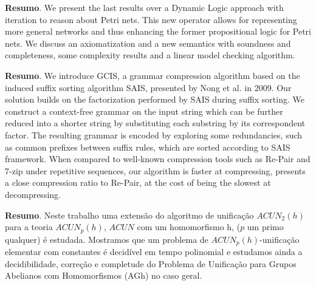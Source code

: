	\vspace{24pt}


	\noindent\textbf{Resumo}.\label{blv} 
	We present the last results over a Dynamic Logic approach with iteration to reason about Petri nets. This new operator allows for representing more general networks and thus enhancing the former propositional logic for Petri nets. We discuss an axiomatization and a new semantics with soundness and completeness, some complexity results and a linear model checking algorithm.

\vspace{24pt}
	
	
	\noindent\textbf{Resumo}.\label{ds} 
	We introduce GCIS, a grammar compression algorithm based on the induced suffix sorting algorithm SAIS, presented by Nong et al. in 2009. Our solution builds on the factorization performed by SAIS during suffix sorting. We construct a context-free grammar on the input string which can be further reduced into a shorter string by substituting each substring by its correspondent factor. The resulting grammar is encoded by exploring some redundancies, such as common prefixes between suffix rules, which are sorted according to SAIS framework. When compared to well-known compression tools such as Re-Pair and 7-zip under repetitive sequences, our algorithm is faster at compressing, presents a close compression ratio to Re-Pair, at the cost of being the slowest at decompressing.
	
	\vspace{24pt}
	
	
	\noindent\textbf{Resumo}.\label{dv} 	Neste trabalho uma extensão do algoritmo de unificação $ACUN_2(h)$ para a teoria $ACUN_p(h)$, $ACUN$ com um homomorfismo h, ($p$ um primo qualquer) é estudada. Mostramos que um problema de $ACUN_p(h)$-unificação elementar com constantes é decidível em tempo polinomial e estudamos ainda a decidibilidade, correção e completude 	do Problema de Unificação para Grupos Abelianos com Homomorfismos (AGh) no caso geral. 
	
